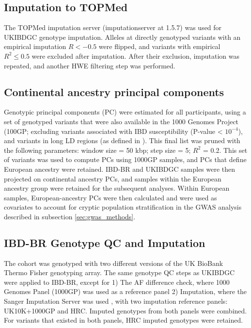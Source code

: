 \subsection{Imputation to TOPMed}
The TOPMed imputation server (imputationserver at 1.5.7) was used for UKIBDGC genotype imputation. Alleles at directly genotyped variants with an empirical imputation $R < -0.5$ were flipped, and variants with empirical $R^{2} \leq 0.5$ were excluded after imputation. After their exclusion, imputation was repeated, and another HWE filtering step was performed.

\subsection{Continental ancestry principal components}
Genotypic principal components (PC) were estimated for all participants, using a set of genotyped variants that were also available in the 1000 Genomes Project (100GP; excluding variants associated with IBD susceptibility (P-value < $10^{-4}$), and variants in long LD regions (as defined in \cite{plink_high_ld}). This final list was pruned with the following parameters: window size = 50 kbp; step size = 5; $R^{2}$ = 0.2. This set of variants was used to compute PCs using 1000GP samples, and PCs that define European ancestry were retained. IBD-BR and UKIBDGC samples were then projected on continental ancestry PCs, and samples within the European ancestry group were retained for the subsequent analyses. Within European samples, European-ancestry PCs were then calculated and were used as covariates to account for cryptic population stratification in the GWAS analysis described in subsection \ref{sec:gwas_methods}.  

\subsection{IBD-BR Genotype QC and Imputation}
The cohort was genotyped with two different versions of the UK BioBank Thermo Fisher genotyping array. The same genotype QC steps as UKIBDGC were applied to IBD-BR, except for 1) The AF difference check, where 1000 Genomes Panel (1000GP) was used as a reference panel 2) Imputation, where the Sanger Imputation Server was used \cite{1000gp}, with two imputation reference panels: UK10K+1000GP and HRC. Imputed genotypes from both panels were combined. For variants that existed in both panels, HRC imputed genotypes were retained. \\



